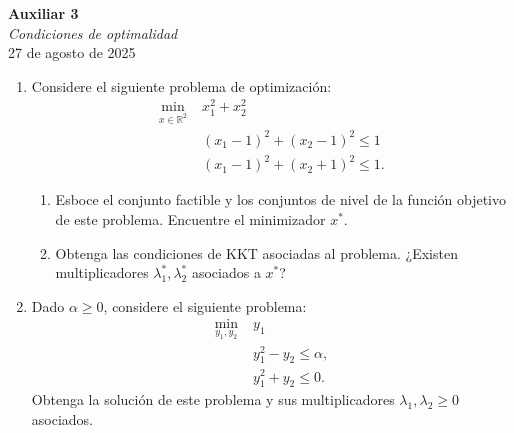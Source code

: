 \documentclass{article}
\begin{document}


\begin{center}
    \Huge{\textbf{Auxiliar 3}}\\
\textit{\large{Condiciones de optimalidad}}\\
    \normalsize
    27 de agosto de 2025
\end{center}

\begin{enumerate}
	\item Considere el siguiente problema de optimización:
		\begin{align*}
			\min_{x \in \mathbb{R}^2} \; & x_1^2 + x_2^2 \\
						     & (x_1 - 1)^2 + (x_2 - 1)^2 \leq 1 \\
						     & (x_1 - 1)^2 + (x_2 + 1)^2 \leq 1.
		\end{align*}
		\begin{enumerate}
			\item Esboce el conjunto factible y los conjuntos de nivel de la función objetivo de este problema. Encuentre el minimizador \(x^*\).
			\item Obtenga las condiciones de KKT asociadas al problema. ¿Existen multiplicadores \(\lambda_1^*, \lambda_2^*\) asociados a \(x^*\)?
		\end{enumerate}
	\item Dado \(\alpha \geq 0\), considere el siguiente problema:
		\begin{align*}
			\min_{y_1, y_2} \; & y_1 \\
					   & y_1^2 - y_2 \leq \alpha, \\
					   & y_1^2 + y_2 \leq 0.
		\end{align*}
		Obtenga la solución de este problema y sus multiplicadores \(\lambda_1, \lambda_2 \geq 0\) asociados.


\end{enumerate}
\end{document}
